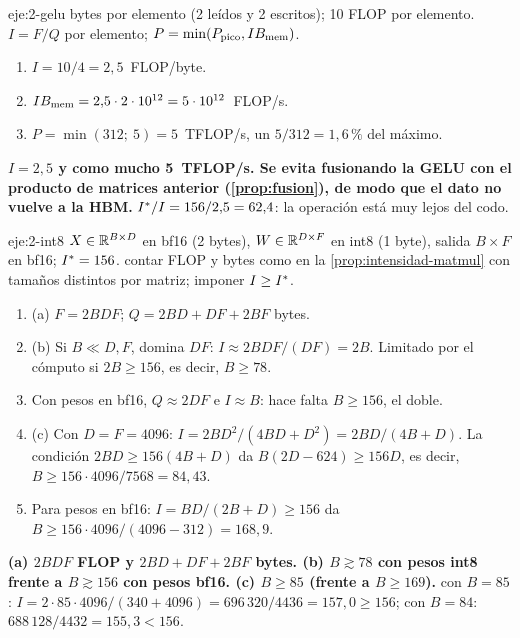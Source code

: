 \begin{solucion}{eje:2-gelu}
 bytes por elemento (2 leídos y 2 escritos); 10 FLOP por elemento.
\planteamiento $I=F/Q$ por elemento; $P=\min(P_{\mathrm{pico}},IB_{\mathrm{mem}})$.
\pasos
\begin{enumerate}[label=\arabic*.]
  \item $I=10/4=2{,}5$~FLOP/byte.
  \item $IB_{\mathrm{mem}}=2{,}5\cdot 2\cdot 10^{12}=5\cdot 10^{12}$~FLOP/s.
  \item $P=\min(312;\ 5)=5$~TFLOP/s, un $5/312=1{,}6\,\%$ del máximo.
\end{enumerate}
\resultado \textbf{$I=2{,}5$ y como mucho 5~TFLOP/s. Se evita fusionando la GELU con el producto de matrices anterior (\cref{prop:fusion}), de modo que el dato no vuelve a la HBM.}
\comprobacion $I^{\ast}/I=156/2{,}5=62{,}4$: la operación está muy lejos del codo.
\end{solucion}

\begin{solucion}{eje:2-int8}
\datos $X\in\mathbb{R}^{B\times D}$ en bf16 (2 bytes), $W\in\mathbb{R}^{D\times F}$ en int8 (1 byte), salida $B\times F$ en bf16; $I^{\ast}=156$.
\planteamiento contar FLOP y bytes como en la \cref{prop:intensidad-matmul} con tamaños distintos por matriz; imponer $I\ge I^{\ast}$.
\pasos
\begin{enumerate}[label=\arabic*.]
  \item (a) $F=2BDF$; $Q=2BD+DF+2BF$ bytes.
  \item (b) Si $B\ll D,F$, domina $DF$: $I\approx 2BDF/(DF)=2B$. Limitado por el cómputo si $2B\ge 156$, es decir, $B\ge 78$.
  \item Con pesos en bf16, $Q\approx 2DF$ e $I\approx B$: hace falta $B\ge 156$, el doble.
  \item (c) Con $D=F=4096$: $I=2BD^{2}/(4BD+D^{2})=2BD/(4B+D)$. La condición $2BD\ge 156(4B+D)$ da $B(2D-624)\ge 156D$, es decir, $B\ge 156\cdot 4096/7568=84{,}43$.
  \item Para pesos en bf16: $I=BD/(2B+D)\ge 156$ da $B\ge 156\cdot 4096/(4096-312)=168{,}9$.
\end{enumerate}
\resultado \textbf{(a) $2BDF$ FLOP y $2BD+DF+2BF$ bytes. (b) $B\gtrsim 78$ con pesos int8 frente a $B\gtrsim 156$ con pesos bf16. (c) $B\ge 85$ (frente a $B\ge 169$).}
\comprobacion con $B=85$: $I=2\cdot 85\cdot 4096/(340+4096)=696\,320/4436=157{,}0\ge 156$; con $B=84$: $688\,128/4432=155{,}3<156$.
\end{solucion}

